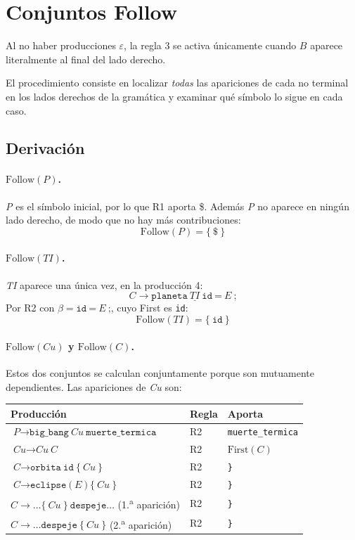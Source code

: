 \documentclass[12pt, letterpaper]{article}
\newcommand{\nt}[1]{\textit{#1}}          %
\newcommand{\tl}[1]{\texttt{#1}}          %
\newcommand{\der}{\ensuremath{\rightarrow}}
\begin{document}
\section{Conjuntos Follow}


Al no haber producciones $\varepsilon$, la regla 3 se activa únicamente
cuando $B$ aparece literalmente al final del lado derecho.

El procedimiento consiste en localizar \emph{todas} las apariciones de
cada no terminal en los lados derechos de la gramática y examinar qué
símbolo lo sigue en cada caso.

\subsection{Derivación}

\paragraph{$\mathrm{Follow}(P)$.} \nt{P} es el símbolo inicial, por lo que
R1 aporta \$. Además \nt{P} no aparece en ningún lado derecho, de modo que
no hay más contribuciones:
\[
  \mathrm{Follow}(P) = \{\ \$\ \}
\]

\paragraph{$\mathrm{Follow}(TI)$.} \nt{TI} aparece una única vez, en la
producción 4:
\[
  \nt{C} \der \tl{planeta}\ \underline{\nt{TI}}\ \tl{id}\ \tl{=}\ \nt{E}\ \tl{;}
\]
Por R2 con $\beta = \tl{id}\ \tl{=}\ \nt{E}\ \tl{;}$, cuyo First es
\tl{id}:
\[
  \mathrm{Follow}(TI) = \{\ \tl{id}\ \}
\]

\paragraph{$\mathrm{Follow}(Cu)$ y $\mathrm{Follow}(C)$.} Estos dos
conjuntos se calculan conjuntamente porque son mutuamente dependientes.
Las apariciones de \nt{Cu} son:

\begin{center}
\begin{tabular}{l l l}
\toprule
Producción & Regla & Aporta \\
\midrule
$\nt{P} \der \tl{big\_bang}\ \nt{Cu}\ \tl{muerte\_termica}$ & R2 & \tl{muerte\_termica} \\
$\nt{Cu} \der \nt{Cu}\ \nt{C}$ & R2 & $\mathrm{First}(C)$ \\
$\nt{C} \der \tl{orbita}\ \tl{id}\ \tl{\{}\ \nt{Cu}\ \tl{\}}$ & R2 & \tl{\}} \\
$\nt{C} \der \tl{eclipse}\ \tl{(}\ \nt{E}\ \tl{)}\ \tl{\{}\ \nt{Cu}\ \tl{\}}$ & R2 & \tl{\}} \\
$\nt{C} \der \ldots \tl{\{}\ \nt{Cu}\ \tl{\}}\ \tl{despeje} \ldots$ (1.\textsuperscript{a} aparición) & R2 & \tl{\}} \\
$\nt{C} \der \ldots \tl{despeje}\ \tl{\{}\ \nt{Cu}\ \tl{\}}$ (2.\textsuperscript{a} aparición) & R2 & \tl{\}} \\
\bottomrule
\end{tabular}
\end{center}
\end{document}
